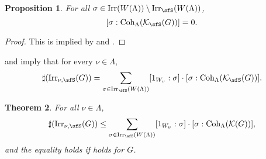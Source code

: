 \documentclass[12pt]{amsart}
\def\subset{\subseteq}
\newcommand{\CK}{{\mathcal {K}}}
\newcommand{\CO}{{\mathcal {O}}}
\newcommand{\CV}{{\mathcal {V}}}
\numberwithin{equation}{section}
\newtheorem{thm}{Theorem}[section]
\newtheorem{prop}[thm]{Proposition}
\theoremstyle{remark}
\def\Irr{\mathrm{Irr}}
\def\Coh{\mathrm{Coh}}
\providecommand{\nsubset}{\not\subset}
\newcommand{\Lam}{{[\lambda]}}
\begin{document}
\begin{prop}\label{count2}
For all $\sigma\in \Irr(W(\Lambda))\setminus \Irr_\sfS(W(\Lambda))$,  %
  \[
    [\sigma:\Coh_{\Lambda}(\CK_\sfS(G))]=0.
  \]

\end{prop}
\begin{proof}
This is implied by 
and .
\end{proof}


 and  imply that  for every $\nu\in \Lambda$,
\begin{equation}\label{leq002}
  \sharp(\Irr_{\nu,\sfS}(G)) = \sum_{\sigma \in \Irr_\sfS(W(\Lambda))} [1_{W_{\nu}}: \sigma]\cdot [\sigma:\Coh_{\Lambda}(\CK_\sfS(G))].
  \end{equation}



 \begin{thm}\label{counteq}
  For all $\nu\in \Lambda$,
  \begin{equation*}%
  \sharp(\Irr_{\nu,\sfS}(G)) \leq  \sum_{\sigma \in \Irr_\sfS(W(\Lambda))} [1_{W_{\nu}}: \sigma]\cdot [\sigma:\Coh_{\Lambda}(\CK(G))],
\end{equation*}
  and the equality holds if  holds for $G$.
    \end{thm}
\end{document}
